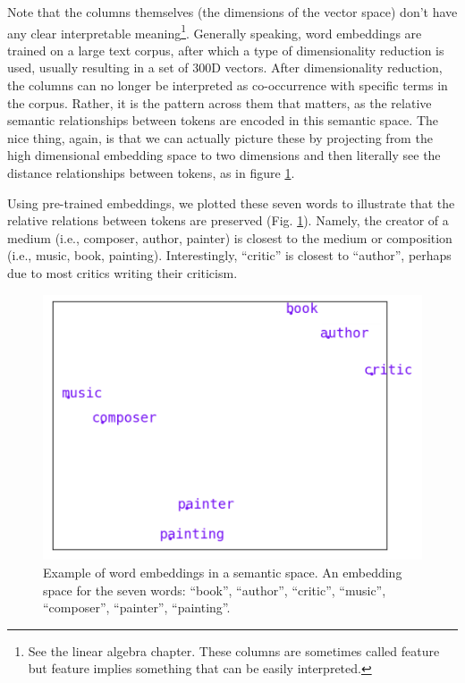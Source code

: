 Note that the columns themselves (the dimensions of the vector space) don't have any clear interpretable meaning\footnote{See the linear algebra chapter. These columns are sometimes called feature but feature implies something that can be easily interpreted.}. Generally speaking, word embeddings are trained on a large text corpus, after which a type of dimensionality reduction is used, usually resulting in a set of 300D vectors. After dimensionality reduction, the columns can no longer be interpreted as co-occurrence with specific terms in the corpus. Rather, it is the pattern across them that matters, as the relative semantic relationships between tokens are encoded in this semantic space. The nice thing, again, is that we can actually picture these by projecting from the high dimensional embedding space to two dimensions and then literally see the distance relationships between tokens, as in figure \ref{f:writerPainterExample}.  

Using pre-trained embeddings, we plotted these seven words to illustrate that the relative relations between tokens are preserved (Fig. \ref{f:writerPainterExample}). Namely, the creator of a medium (i.e., composer, author, painter) is closest to the medium or composition (i.e., music, book, painting). Interestingly, ``critic'' is closest to ``author'', perhaps due to most critics writing their criticism.


\begin{figure}[h]
    \centering
    \includegraphics[scale=.5]{./images/Word_vector_demo.png}
    \caption[Generated using \url{http://vectors.nlpl.eu/explore/embeddings/en/}.]{Example of word embeddings in a semantic space. An embedding space for the seven words: ``book'', ``author'', ``critic'', ``music'', ``composer'', ``painter'', ``painting''. }
 \label{f:writerPainterExample}
\end{figure}

